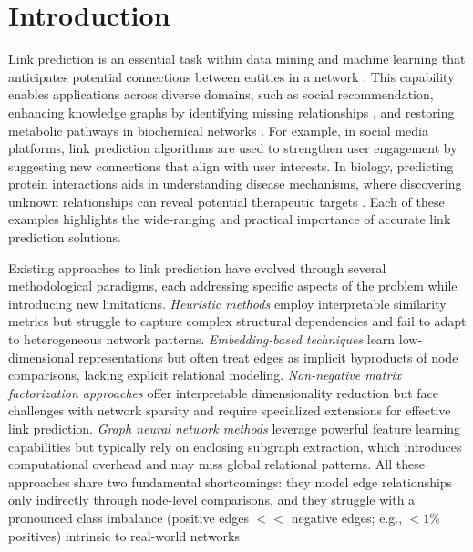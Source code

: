 \documentclass[pdflatex,sn-mathphys-num]{sn-jnl}%
\theoremstyle{thmstyleone}%
\theoremstyle{thmstyletwo}%
\theoremstyle{thmstylethree}%
\theoremstyle{plain} %
\theoremstyle{definition} %
\theoremstyle{remark} %
\theoremstyle{plain} %
\begin{document}
\maketitle

\section{Introduction}
\label{sec:introduction}


Link prediction is an essential task within data mining and machine learning that anticipates potential connections between entities in a network \cite{32zhang2017weisfeiler}. 
This capability enables applications across diverse domains, such as social recommendation, enhancing knowledge graphs by identifying missing relationships \cite{nickel2015review},  and restoring metabolic pathways in biochemical networks \cite{oyetunde2017boostgapfill}. 
For example, in social media platforms, link prediction algorithms are used to strengthen user engagement by suggesting new connections that align with user interests. 
In biology, predicting protein interactions aids in understanding disease mechanisms, where discovering unknown relationships can reveal potential therapeutic targets \cite{kovacs2019network}. 
Each of these examples highlights the wide-ranging and practical importance of accurate link prediction solutions.

Existing approaches to link prediction have evolved through several methodological paradigms, each addressing specific aspects of the problem while introducing new limitations.
\emph{Heuristic methods} \cite{barabasi1999emergence,adamic2003friends,23zhou2009predicting} employ interpretable similarity metrics but struggle to capture complex structural dependencies and fail to adapt to heterogeneous network patterns. 
\emph{Embedding-based techniques} \cite{koren2009matrix,28ganaie2022ensemble,29tang2015line} learn low-dimensional representations but often treat edges as implicit byproducts of node comparisons, lacking explicit relational modeling. 
\emph{Non-negative matrix factorization approaches} \cite{yao2024deep} offer interpretable dimensionality reduction but face challenges with network sparsity and require specialized extensions for effective link prediction. 
\emph{Graph neural network methods} \cite{14zhang2018link,33cai2020multi,chamberlain2023elph} leverage powerful feature learning capabilities but typically rely on enclosing subgraph extraction, which introduces computational overhead and may miss global relational patterns. 
All these approaches share two fundamental shortcomings: they model edge relationships only indirectly through node-level comparisons, and they struggle with a pronounced class imbalance (positive edges $<<$ negative edges; e.g., $<1\%$ positives) intrinsic to real-world networks
\end{document}
